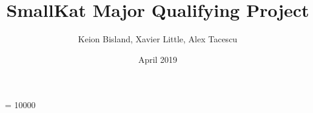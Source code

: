\usepackage[utf8]{inputenc}

\usepackage{bookmark}     %

\usepackage{biblatex}     %

\usepackage{enumitem}     %
\usepackage{amssymb}      %

\usepackage{amsmath}
\usepackage{geometry}
\usepackage{graphicx}
\usepackage{multirow}
\usepackage[pagestyles]{titlesec}
\usepackage{titling}
\usepackage{sectsty}
\usepackage{caption}
\usepackage{tocstyle}

\usepackage{booktabs}%
\usepackage{float}
\usepackage{longtable}
\makeatletter
\renewcommand\paragraph{\@startsection{paragraph}{4}{\z@}%
            {-2.5ex\@plus -1ex \@minus -.25ex}%
            {1.25ex \@plus .25ex}%
            {\normalfont\normalsize\bfseries}}
\makeatother
\setcounter{secnumdepth}{4} %
\setcounter{tocdepth}{4}    %


\newcommand\scalemath[2]{\scalebox{#1}{\mbox{\ensuremath{\displaystyle #2}}}}
\usepackage[]{algorithm2e}
\pdfpagewidth 8.5in
\pdfpageheight 11in

\title{SmallKat Major Qualifying Project}
\author{Keion Bisland, Xavier Little, Alex Tacescu}
\date{April 2019}



\newcommand{\linespacing}{1.5}

\interfootnotelinepenalty = 10000 %

